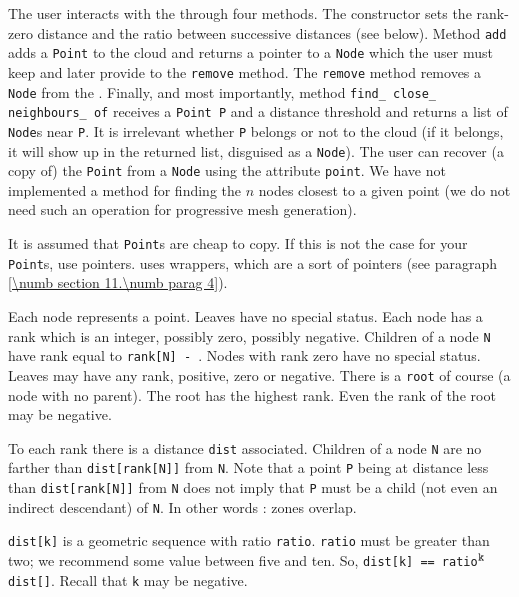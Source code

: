 The user interacts with the {\small\tt{}} through four methods.
The constructor sets the rank-zero distance and the ratio between successive
distances (see below).
Method {\small\tt add} adds a {\small\tt Point} to the cloud and returns a pointer to a
{\small\tt Node} which the user must keep and later provide to the {\small\tt remove} method.
The {\small\tt remove} method removes a {\small\tt Node} from the {\small\tt{}}.
Finally, and most importantly, method {\small\tt find\_\,close\_\,neighbours\_\,of} receives a
{\small\tt Point P} and a distance threshold and returns a list of {\small\tt Node}s near
{\small\tt P}.
It is irrelevant whether {\small\tt P} belongs or not to the cloud (if it belongs, it will
show up in the returned list, disguised as a {\small\tt Node}).
The user can recover (a copy of) the {\small\tt Point} from a {\small\tt Node} using the attribute
{\small\tt point}.
We have not implemented a method for finding the $n$ nodes closest to a given point
(we do not need such an operation for progressive mesh generation).

It is assumed that {\small\tt Point}s are cheap to copy.
If this is not the case for your {\small\tt Point}s, use pointers.
{\ManiFEM} uses wrappers, which are a sort of pointers (see paragraph
\ref{\numb section 11.\numb parag 4}).

Each node represents a point.
Leaves have no special status.
Each node has a rank which is an integer, possibly zero, possibly negative.
Children of a node {\small\tt N} have rank equal to {\small\tt rank[N] - }.
Nodes with rank zero have no special status.
Leaves may have any rank, positive, zero or negative.
There is a {\small\tt root} of course (a node with no parent).
The root has the highest rank.
Even the rank of the root may be negative.

To each rank there is a distance {\small\tt dist} associated.
Children of a node {\small\tt N} are no farther than {\small\tt dist[rank[N]]} from {\small\tt N}.
Note that a point {\small\tt P} being at distance less than {\small\tt dist[rank[N]]} from
{\small\tt N} does not imply that {\small\tt P} must be a child (not even an indirect descendant)
of {\small\tt N}.
In other words : zones overlap.

{\small\tt dist[k]} is a geometric sequence with ratio {\small\tt ratio}.
{\small\tt ratio} must be greater than two; we recommend some value between five and ten.
So, {\small\tt dist[k] == ratio}$^{\hbox{\footnotesize\tt k }}${\small\tt dist[]}.
Recall that {\small\tt k} may be negative.

